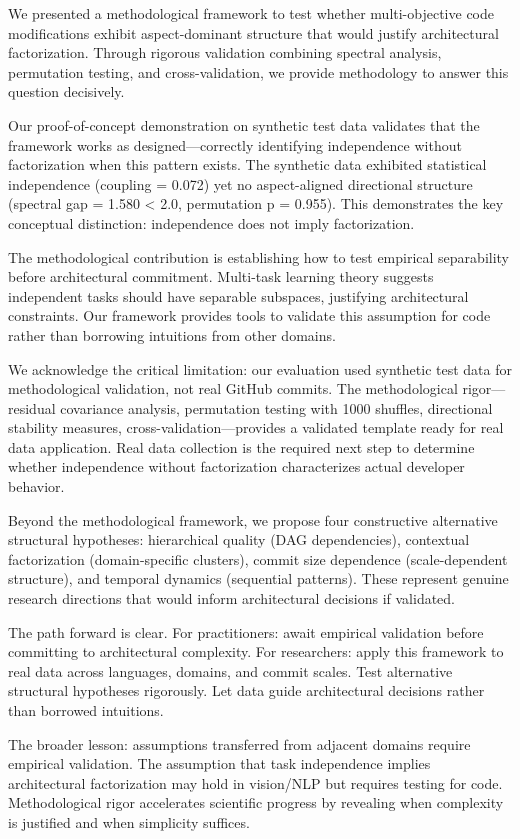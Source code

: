 
We presented a methodological framework to test whether multi-objective code modifications exhibit aspect-dominant structure that would justify architectural factorization. Through rigorous validation combining spectral analysis, permutation testing, and cross-validation, we provide methodology to answer this question decisively.

Our proof-of-concept demonstration on synthetic test data validates that the framework works as designed—correctly identifying independence without factorization when this pattern exists. The synthetic data exhibited statistical independence (coupling = 0.072) yet no aspect-aligned directional structure (spectral gap = 1.580 < 2.0, permutation p = 0.955). This demonstrates the key conceptual distinction: independence does not imply factorization.

The methodological contribution is establishing how to test empirical separability before architectural commitment. Multi-task learning theory suggests independent tasks should have separable subspaces, justifying architectural constraints. Our framework provides tools to validate this assumption for code rather than borrowing intuitions from other domains.

We acknowledge the critical limitation: our evaluation used synthetic test data for methodological validation, not real GitHub commits. The methodological rigor—residual covariance analysis, permutation testing with 1000 shuffles, directional stability measures, cross-validation—provides a validated template ready for real data application. Real data collection is the required next step to determine whether independence without factorization characterizes actual developer behavior.

Beyond the methodological framework, we propose four constructive alternative structural hypotheses: hierarchical quality (DAG dependencies), contextual factorization (domain-specific clusters), commit size dependence (scale-dependent structure), and temporal dynamics (sequential patterns). These represent genuine research directions that would inform architectural decisions if validated.

The path forward is clear. For practitioners: await empirical validation before committing to architectural complexity. For researchers: apply this framework to real data across languages, domains, and commit scales. Test alternative structural hypotheses rigorously. Let data guide architectural decisions rather than borrowed intuitions.

The broader lesson: assumptions transferred from adjacent domains require empirical validation. The assumption that task independence implies architectural factorization may hold in vision/NLP but requires testing for code. Methodological rigor accelerates scientific progress by revealing when complexity is justified and when simplicity suffices.
